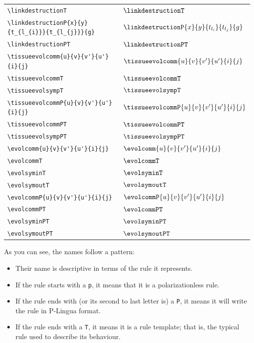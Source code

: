 \documentclass{article}
\begin{document}
{\begin{longtable}{ll}
  \verb=\linkdestructionT= & $\linkdestructionT$ \\
  \verb=\linkdestructionP{x}{y}{t_{l_{i}}}{t_{l_{j}}}{g}= & $\linkdestructionP{x}{y}{t_{l_{i}}}{t_{l_{j}}}{g}$ \\
  \verb=\linkdestructionPT= & $\linkdestructionPT$ \\
  \verb=\tissueevolcomm{u}{v}{v'}{u'}{i}{j}= & $\tissueevolcomm{u}{v}{v'}{u'}{i}{j}$ \\
  \verb=\tissueevolcommT= & $\tissueevolcommT$ \\
  \verb=\tissueevolsympT= & $\tissueevolsympT$ \\
  \verb=\tissueevolcommP{u}{v}{v'}{u'}{i}{j}= & $\tissueevolcommP{u}{v}{v'}{u'}{i}{j}$ \\
  \verb=\tissueevolcommPT= & $\tissueevolcommPT$ \\
  \verb=\tissueevolsympPT= & $\tissueevolsympPT$ \\
  \verb=\evolcomm{u}{v}{v'}{u'}{i}{j}= & $\evolcomm{u}{v}{v'}{u'}{i}{j}$ \\
  \verb=\evolcommT= & $\evolcommT$ \\
  \verb=\evolsyminT= & $\evolsyminT$ \\
  \verb=\evolsymoutT= & $\evolsymoutT$ \\
  \verb=\evolcommP{u}{v}{v'}{u'}{i}{j}= & $\evolcommP{u}{v}{v'}{u'}{i}{j}$ \\
  \verb=\evolcommPT= & $\evolcommPT$ \\
  \verb=\evolsyminPT= & $\evolsyminPT$ \\
  \verb=\evolsymoutPT= & $\evolsymoutPT$ \\
\end{longtable}
}

As you can see, the names follow a pattern:

\begin{itemize}
\item Their name is descriptive in terms of the rule it represents.
\item If the rule starts with a \texttt{p}, it means that it is a
  polarizationless rule.
\item If the rule ends with (or its second to last letter is) a
  \texttt{P}, it means it will write the rule in P-Lingua format.
\item If the rule ends with a \texttt{T}, it means it is a rule
  template; that is, the typical rule used to describe its behaviour.
\end{itemize}
\end{document}
